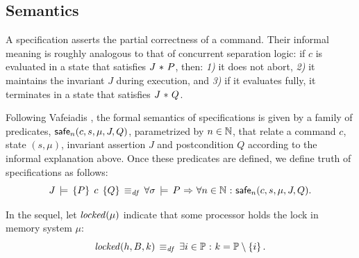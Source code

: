 \documentclass[11pt]{report}
\begin{document}
\subsection{Semantics}
\label{sec:specification-semantics}

A specification asserts the partial correctness of a command. Their informal meaning is roughly analogous to that of concurrent separation logic: if $c$ is evaluated in a state that satisfies $J \operatorname{\,\ast\,} P$, then: \emph{1)} it does not abort, \emph{2)} it maintains the invariant $J$ during execution, and \emph{3)} if it evaluates fully, it terminates in a state that satisfies $J \operatorname{\,\ast\,} Q$. 

Following Vafeiadis \cite{V11}, the formal semantics of specifications is given by a family of predicates, $\mathsf{safe}_{n}(c,s,\mu,J,Q)$, parametrized by $n \in \mathbb{N}$, that relate a command $c$, state $(s,\mu)$, invariant assertion $J$ and postcondition $Q$ according to the informal explanation above. Once these predicates are defined, we define truth of specifications as follows: \[ J\,\models\,\left\lbrace P \right\rbrace\;c\;\left\lbrace Q \right\rbrace \operatorname{\;\equiv_{\mathit{df}}\;} \forall \sigma \,\models\, P \operatorname{\,\Rightarrow\,} \forall n \in \mathbb{N} \operatorname{\,:\,} \mathsf{safe}_{n}(c,s,\mu,J,Q).\]

In the sequel, let $\mathit{locked}(\mu)$ indicate that some processor holds the lock in memory system $\mu$: \[ \mathit{locked}(h,B,k) \operatorname{\;\equiv_{\mathit{df}}\;} \exists i \in \mathbb{P} \operatorname{\,:\,} k = \mathbb{P} \setminus \left\lbrace i \right\rbrace. \]
\end{document}
